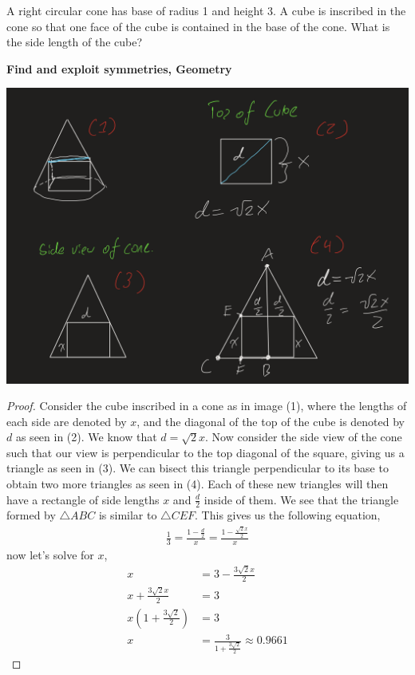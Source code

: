 \documentclass[11pt]{article}
\newenvironment{problem}[2][Problem\!]{\begin{trivlist}
\item[\hskip \labelsep {\bfseries #1}\hskip \labelsep {\bfseries #2}]}{\end{trivlist}}
\begin{document}
\begin{tcolorbox}
    \begin{problem} {IC | 12-03 | PP 40}
        A right circular cone has base of radius 1 and height 3. A cube is inscribed in the cone so that one face of the cube is contained in the base of the cone. What is the side length of the cube?
    \end{problem}
    \textbf{Find and exploit symmetries, Geometry}
\end{tcolorbox}
\includegraphics[scale=0.5]{diagram}
\begin{proof}
    Consider the cube inscribed in a cone as in image (1), where the lengths of each side are denoted by $x$, and the diagonal of the top of the cube is denoted by $d$ as seen in (2). We know that $d = \sqrt2 x$. Now consider the side view of the cone such that our view is perpendicular to the top diagonal of the square, giving us a triangle as seen in (3). We can bisect this triangle perpendicular to its base to obtain two more triangles as seen in (4). Each of these new triangles will then have a rectangle of side lengths $x$ and $\frac{d}{2}$ inside of them. We see that the triangle formed by $\triangle ABC$ is similar to $\triangle CEF$. This gives us the following equation,
    \begin{align*}
        \frac{1}{3} = \frac{1-\frac{d}{2}}{x} = \frac{1- \frac{\sqrt2 x}{2}}{x}
    \end{align*}
    now let's solve for $x$,
    \begin{align*}
        x &= 3 - \frac{3\sqrt2 x}{2}\\
        x + \frac{3\sqrt2 x}{2} &= 3 \\
        x(1 + \frac{3\sqrt 2}{2}) &= 3 \\
        x &= \frac{3}{1 + \frac{3\sqrt2}{2}} \approx 0.9661
    \end{align*}
\end{proof}
\end{document}
